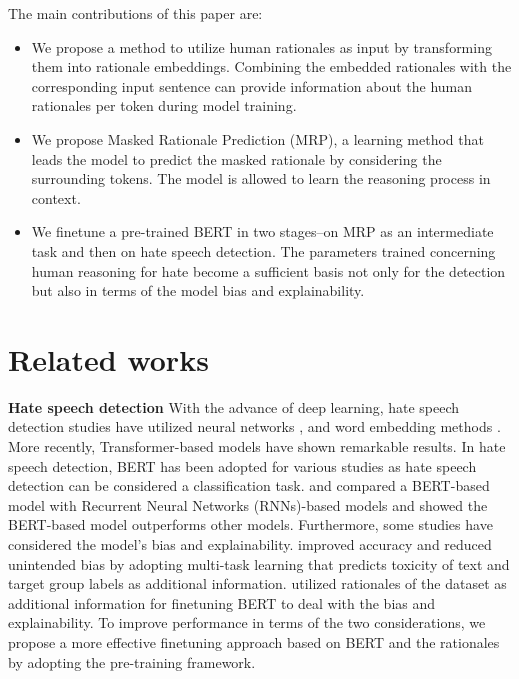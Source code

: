 \documentclass[11pt]{article}
\begin{document}
The main contributions of this paper are:
\begin{itemize}
    \item We propose a method to utilize human rationales as input by transforming them into rationale embeddings. Combining the embedded rationales with the corresponding input sentence can provide information about the human rationales per token during model training.
    \item We propose Masked Rationale Prediction (MRP), a learning method that leads the model to predict the masked rationale by considering the surrounding tokens. The model is allowed to learn the reasoning process in context.
    \item We finetune a pre-trained BERT in two stages--on MRP as an intermediate task and then on hate speech detection. The parameters trained concerning human reasoning for hate become a sufficient basis not only for the detection but also in terms of the model bias and explainability.
\end{itemize}

\section{Related works}
\noindent
\textbf{Hate speech detection}   With the advance of deep learning, hate speech detection studies have utilized neural networks \citep{badjatiya2017deep, han2019unsupervised}, and word embedding methods \citep{mckeown2018predictive}. More recently, Transformer-based \citep{vaswani2017attention} models have shown remarkable results. In hate speech detection, BERT has been adopted for various studies as hate speech detection can be considered a classification task. \citet{mandl2019overview} and \citet{ranasinghe2019brums} compared a BERT-based model with Recurrent Neural Networks (RNNs)-based models and showed the BERT-based model outperforms other models. Furthermore, some studies have considered the model's bias and explainability. \citet{vaidya2020empirical} improved accuracy and reduced unintended bias by adopting multi-task learning that predicts toxicity of text and target group labels as additional information. \citet{mathew2020hatexplain} utilized rationales of the dataset as additional information for finetuning BERT to deal with the bias and explainability. To improve performance in terms of the two considerations, we propose a more effective finetuning approach based on BERT and the rationales by adopting the pre-training framework.
\end{document}
